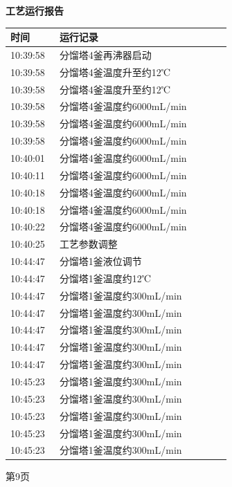 \documentclass[UTF8,10pt,a4paper,fontset=fandol]{ctexart}
\begin{document}
\newpage

\noindent
\begin{minipage}[t]{0.47\linewidth}
\centering
\textbf{工艺运行报告}

\vspace{2mm}
\scriptsize
\begin{tabular}{|p{0.20\linewidth}|p{0.70\linewidth}|}
\hline
时间 & 运行记录 \\ \hline
10:39:58 & 分馏塔4釜再沸器启动 \\ \hline
10:39:58 & 分馏塔4釜温度升至约12℃ \\ \hline
10:39:58 & 分馏塔4釜温度升至约12℃ \\ \hline
10:39:58 & 分馏塔4釜温度约6000mL/min \\ \hline
10:39:58 & 分馏塔4釜温度约6000mL/min \\ \hline
10:39:58 & 分馏塔4釜温度约6000mL/min \\ \hline
10:40:01 & 分馏塔4釜温度约6000mL/min \\ \hline
10:40:11 & 分馏塔4釜温度约6000mL/min \\ \hline
10:40:18 & 分馏塔4釜温度约6000mL/min \\ \hline
10:40:18 & 分馏塔4釜温度约6000mL/min \\ \hline
10:40:22 & 分馏塔4釜温度约6000mL/min \\ \hline
10:40:25 & 工艺参数调整 \\ \hline
10:44:47 & 分馏塔1釜液位调节 \\ \hline
10:44:47 & 分馏塔1釜温度约12℃ \\ \hline
10:44:47 & 分馏塔1釜温度约300mL/min \\ \hline
10:44:47 & 分馏塔1釜温度约300mL/min \\ \hline
10:44:47 & 分馏塔1釜温度约300mL/min \\ \hline
10:44:47 & 分馏塔1釜温度约300mL/min \\ \hline
10:44:47 & 分馏塔1釜温度约300mL/min \\ \hline
10:45:23 & 分馏塔1釜温度约300mL/min \\ \hline
10:45:23 & 分馏塔1釜温度约300mL/min \\ \hline
10:45:23 & 分馏塔1釜温度约300mL/min \\ \hline
10:45:23 & 分馏塔1釜温度约300mL/min \\ \hline
10:45:23 & 分馏塔1釜温度约300mL/min \\ \hline
\end{tabular}

\vspace{1mm}

第9页
\end{minipage}
\end{document}
